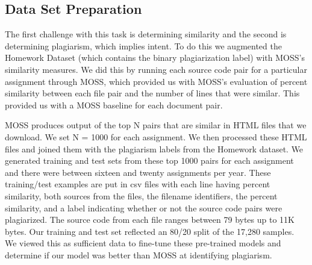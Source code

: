 \documentclass[twocolumn]{article}
\begin{document}

\subsection{\normalsize Data Set Preparation}



The first challenge with this task is determining similarity and the second is determining plagiarism, which implies intent. To do this we augmented the Homework Dataset \cite{ljubovic} (which contains the binary plagiarization label) with MOSS's similarity measures. We did this by running each source code pair for a particular assignment through MOSS, which provided us with MOSS's evaluation of percent similarity between each file pair and the number of lines that were similar. This provided us with a MOSS baseline for each document pair. 

MOSS produces output of the top N pairs that are similar in HTML files that we download. We set N = 1000 for each assignment. We then processed these HTML files and joined them with the plagiarism labels from the Homework dataset. We generated training and test sets from these top 1000 pairs for each assignment and there were between sixteen and twenty assignments per year. These training/test examples are put in csv files with each line having percent similarity, both sources from the files, the filename identifiers, the percent similarity, and a label indicating whether or not the source code pairs were plagiarized.  The source code from each file ranges between 79 bytes up to 11K bytes. Our training and test set reflected an 80/20 split of the 17,280 samples. We viewed this as sufficient data to fine-tune these pre-trained models and determine if our model was better than MOSS at identifying plagiarism. 
\end{document}
